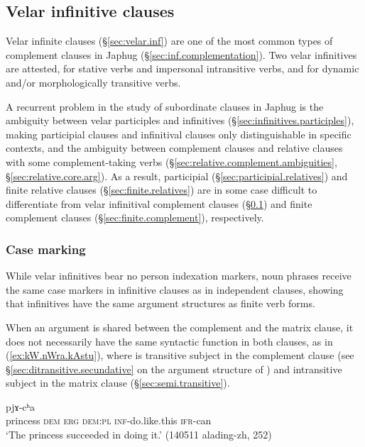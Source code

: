 \subsection{Velar infinitive clauses} \label{sec:velar.infinitives.complement.clauses}
Velar infinite clauses (§\ref{sec:velar.inf}) are one of the most common types of complement clauses in Japhug (§\ref{sec:inf.complementation}). Two velar infinitives are attested,  for stative verbs and impersonal intransitive verbs, and  for dynamic and/or morphologically transitive verbs. 

A recurrent problem in the study of subordinate clauses in Japhug is the ambiguity between velar participles and infinitives (§\ref{sec:infinitives.participles}), making participial clauses and infinitival clauses only distinguishable in specific contexts, and the ambiguity between complement clauses and relative clauses with some complement-taking verbs (§\ref{sec:relative.complement.ambiguities}, §\ref{sec:relative.core.arg}). As a result, participial (§\ref{sec:participial.relatives}) and finite  relative clauses  (§\ref{sec:finite.relatives}) are in some case difficult to differentiate from velar infinitival complement clauses (§\ref{sec:velar.infinitives.complement.clauses}) and finite complement clauses  (§\ref{sec:finite.complement}), respectively. 


\subsubsection{Case marking} \label{sec:case.infinitive}
While velar infinitives bear no person indexation markers, noun phrases receive the same case markers in infinitive clauses as in independent clauses, showing that infinitives have the same argument structures as finite verb forms.

When an argument is shared between the complement and the matrix clause, it does not necessarily have the same syntactic function in both clauses, as in (\ref{ex:kW.nWra.kAstu}), where  is transitive subject in the complement clause (see §\ref{sec:ditransitive.secundative} on the argument structure of ) and intransitive subject in the matrix clause (§\ref{sec:semi.transitive}). 

\begin{exe}
\ex \label{ex:kW.nWra.kAstu}
 pjɤ-cʰa \\
princess \textsc{dem} \textsc{erg} \textsc{dem}:\textsc{pl} \textsc{inf}-do.like.this \textsc{ifr}-can \\
\glt `The princess succeeded in doing it.' (140511 alading-zh, 252)
\end{exe}

